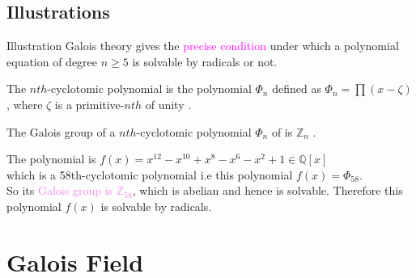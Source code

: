 \documentclass{beamer}
\begin{document}
\subsection{Illustrations}
\begin{frame}{Illustration}
Galois theory gives the \textcolor{magenta}{precise condition} under which a polynomial equation of degree \(n \geq 5\) is solvable by radicals or not.
\vspace{3mm}
\begin{definition}
 The \(nth\)-cyclotomic polynomial is the polynomial \({\Phi}_n\) defined as \({\Phi}_n= \prod {(x-\zeta)}\), where \(\zeta\) is a primitive-\(nth\) of unity \cite{galois}.
\end{definition}

\begin{theorem}[Theorem]
  The Galois group of a \(nth\)-cyclotomic polynomial \({\Phi}_n\) of is \(\mathbb{Z}_n\) \cite{galois}.
\end{theorem}

\vspace{4mm}
 \begin{tcolorbox}[colback=white, colframe=brown!80!black, title={\bfseries \color{white} Example}]
The polynomial is \textcolor{green!50!black}{\(f(x)=x^{12}-x^{10}+x^8-x^6-x^2+1 \in \mathbb{Q}[x]\)} \\
which is a 58th-cyclotomic polynomial \cite{galois} i.e this polynomial \(f(x)={\Phi}_{58}\).\\
So its \textcolor{violet}{Galois group is \(\mathbb{Z}_{58}\)}, which is abelian and hence is solvable. Therefore this polynomial \(f(x)\) is solvable by radicals.
\end{tcolorbox}
\end{frame}

\section{Galois Field}
\end{document}
